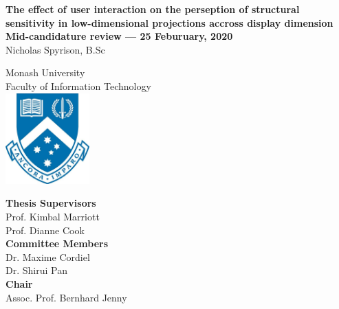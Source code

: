 \documentclass[
  11,
]{article}
\author{}
\date{\vspace{-2.5em}}
\begin{document}

\onehalfspacing
{}

\begin{center}
\huge{\textbf{The effect of user interaction on the perseption of structural 
sensitivity  in low-dimensional projections accross display dimension}}\\
\vspace*{1\baselineskip}
\Large{\textbf{Mid-candidature review --- 25 Feburuary, 2020}}\\
\LARGE{Nicholas Spyrison, B.Sc}\\
\vspace*{1\baselineskip}

\LARGE{Monash University}\\
\Large{Faculty of Information Technology}\\
\vspace*{1\baselineskip}
\includegraphics[height = 3.5cm]{./figures/crest.jpg}\\
\vspace*{1\baselineskip}

\Large{\textbf{Thesis Supervisors}}\\
Prof. Kimbal Marriott\\
Prof. Dianne Cook\\
\vspace*{1\baselineskip}
\Large{\textbf{Committee Members}}\\
Dr. Maxime Cordiel\\
Dr. Shirui Pan\\
\vspace*{1\baselineskip}
\Large{\textbf{Chair}}\\
Assoc. Prof. Bernhard Jenny\\
\end{center}

\doublespacing

\newpage
{}
\end{document}
